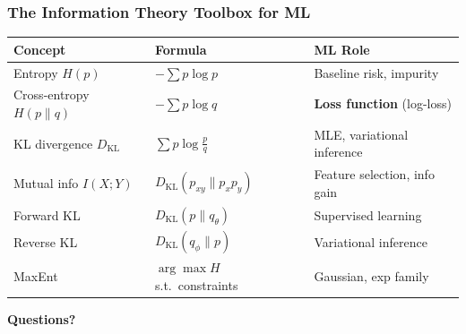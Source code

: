 \documentclass[aspectratio=169]{beamer}
\begin{document}
\begin{frame}
\frametitle{The Information Theory Toolbox for ML}

\vspace{-0.2cm}
\begin{center}
\footnotesize
\renewcommand{\arraystretch}{1.5}
\begin{tabular}{lll}
  \textbf{Concept} & \textbf{Formula} & \textbf{ML Role} \\
  \hline
  Entropy $H(p)$ & $-\sum p\log p$ & Baseline risk, impurity \\
  Cross-entropy $H(p\|q)$ & $-\sum p\log q$ & \textbf{Loss function} (log-loss) \\
  KL divergence $D_{\text{KL}}$ & $\sum p\log\frac{p}{q}$ & MLE, variational inference \\
  Mutual info $I(X;Y)$ & $D_{\text{KL}}(p_{xy}\|p_x p_y)$ & Feature selection, info gain \\
  Forward KL & $D_{\text{KL}}(p\|q_\theta)$ & Supervised learning \\
  Reverse KL & $D_{\text{KL}}(q_\phi\|p)$ & Variational inference \\
  MaxEnt & $\arg\max H$ s.t.\ constraints & Gaussian, exp family \\
  \hline
\end{tabular}
\end{center}

\vspace{0.1cm}
\begin{center}
\end{center}
\end{frame}

\begin{frame}
\begin{center}
  {\Huge\bfseries\textcolor{popblue}{Questions?}}
\end{center}
\end{frame}
\end{document}
